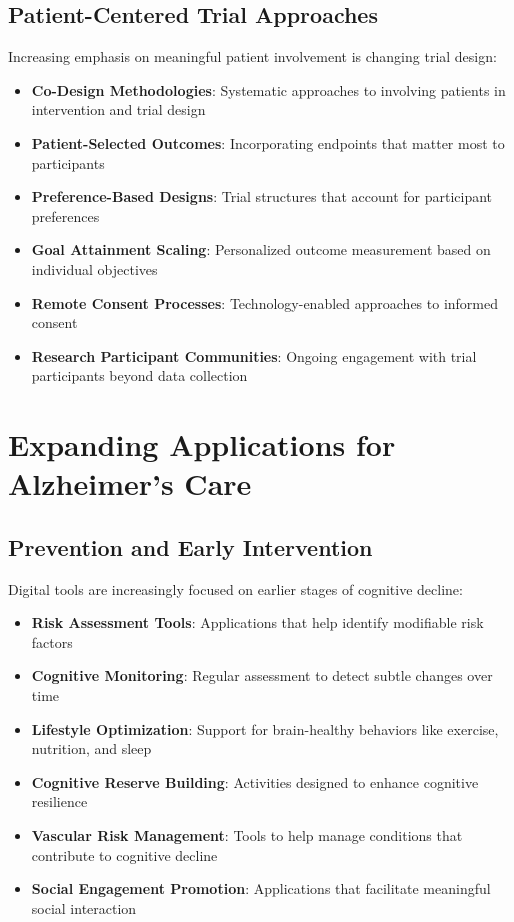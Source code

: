 \subsection{Patient-Centered Trial Approaches}
Increasing emphasis on meaningful patient involvement is changing trial design:

\begin{itemize}
    \item \textbf{Co-Design Methodologies}: Systematic approaches to involving patients in intervention and trial design
    
    \item \textbf{Patient-Selected Outcomes}: Incorporating endpoints that matter most to participants
    
    \item \textbf{Preference-Based Designs}: Trial structures that account for participant preferences
    
    \item \textbf{Goal Attainment Scaling}: Personalized outcome measurement based on individual objectives
    
    \item \textbf{Remote Consent Processes}: Technology-enabled approaches to informed consent
    
    \item \textbf{Research Participant Communities}: Ongoing engagement with trial participants beyond data collection
\end{itemize}

\section{Expanding Applications for Alzheimer's Care}
\subsection{Prevention and Early Intervention}
Digital tools are increasingly focused on earlier stages of cognitive decline:

\begin{itemize}
    \item \textbf{Risk Assessment Tools}: Applications that help identify modifiable risk factors
    
    \item \textbf{Cognitive Monitoring}: Regular assessment to detect subtle changes over time
    
    \item \textbf{Lifestyle Optimization}: Support for brain-healthy behaviors like exercise, nutrition, and sleep
    
    \item \textbf{Cognitive Reserve Building}: Activities designed to enhance cognitive resilience
    
    \item \textbf{Vascular Risk Management}: Tools to help manage conditions that contribute to cognitive decline
    
    \item \textbf{Social Engagement Promotion}: Applications that facilitate meaningful social interaction
\end{itemize}

